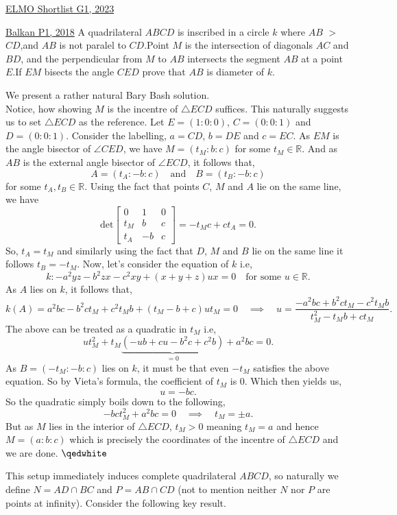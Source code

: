\begin{problem}{14}{\href{https://artofproblemsolving.com/community/c6h3100572p28033718}{ELMO Shortlist G1, 2023}}
\begin{problem}{3}{\href{https://artofproblemsolving.com/community/u571929h1640635p35544553}{Balkan P1, 2018}} 
	A quadrilateral $ABCD$ is inscribed in a circle $k$ where $AB$ $>$ $CD$,and $AB$ is not paralel to $CD$.Point $M$ is the intersection of diagonals $AC$ and $BD$, and the perpendicular from $M$ to $AB$ intersects the segment $AB$ at a point $E$.If $EM$ bisects the angle $CED$ prove that $AB$ is diameter of $k$.
	\begin{numsolution}{1} We present a rather natural Bary Bash solution.\\
Notice, how showing $M$ is the incentre of $\triangle ECD$ suffices. This naturally suggests us to set $\triangle ECD$ as the reference. Let $E=(1:0:0)$, $C=(0:0:1)$ and $D=(0:0:1)$. Consider the labelling, $a=CD$, $b=DE$ and $c=EC$. As $EM$ is the angle bisector of $\angle CED$, we have $M=(t_M:b:c)$ for some $t_M\in\mathbb{R}$. And as $AB$ is the external angle bisector of $\angle ECD$, it follows that,
$$A=(t_A:-b:c)\quad\text{and}\quad B=(t_B:-b:c)$$for some $t_A, t_B\in\mathbb{R}$. Using the fact that points $C$, $M$ and $A$ lie on the same line, we have
$$\text{det}\begin{bmatrix} 0 & 1 & 0\\ t_M & b & c\\ t_A & -b & c \end{bmatrix}=-t_Mc+ct_A=0.$$So, $t_A=t_M$ and similarly using the fact that $D$, $M$ and $B$ lie on the same line it follows $t_B=-t_M$. Now, let's consider the equation of $k$ i.e,
$$k:-a^2yz-b^2zx-c^2xy+(x+y+z)ux=0\quad\text{for some $u\in\mathbb{R}$.}$$As $A$ lies on $k$, it follows that,
$$k(A)=a^2bc-b^2ct_M+c^2t_Mb+(t_M-b+c)ut_M=0\quad\implies\quad u=\frac{-a^2bc+b^2ct_M-c^2t_Mb}{t_M^2-t_Mb+ct_M}.$$The above can be treated as a quadratic in $t_M$ i.e,
$$ut_M^2+t_M\underbrace{(-ub+cu-b^2c+c^2b)}_{=0}+a^2bc=0.$$As $B=(-t_M:-b:c)$ lies on $k$, it must be that even $-t_M$ satisfies the above equation. So by Vieta's formula, the coefficient of $t_M$ is $0$. Which then yields us,
$$u=-bc.$$So the quadratic simply boils down to the following,
$$-bct_M^2+a^2bc=0\quad\implies\quad t_M=\pm a.$$But as $M$ lies in the interior of $\triangle ECD$, $t_M>0$ meaning $t_M=a$ and hence $M=(a:b:c)$ which is precisely the coordinates of the incentre of $\triangle ECD$ and we are done. $\qedwhite$
	\end{numsolution}

	\begin{numsolution}{2}
	This setup immediately induces complete quadrilateral $ABCD$, so naturally we define $N=AD\cap BC$ and $P=AB\cap CD$ (not to mention neither $N$ nor $P$ are points at infinity). Consider the following key result.


\end{numsolution}
\end{problem}
\end{problem}
